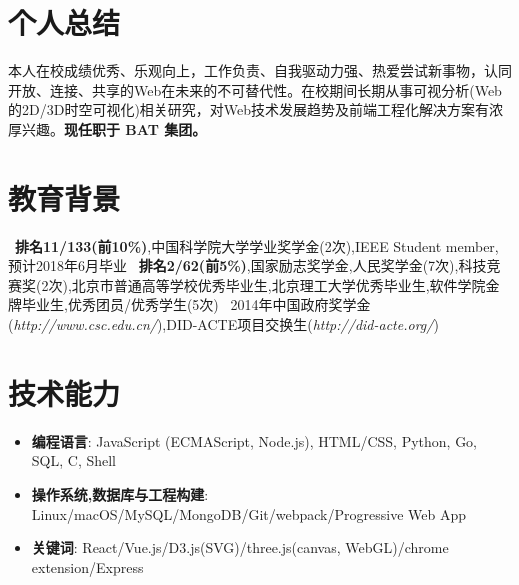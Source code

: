 \documentclass{resume}
\begin{document}

 
\section{个人总结}
本人在校成绩优秀、乐观向上，工作负责、自我驱动力强、热爱尝试新事物，认同开放、连接、共享的Web在未来的不可替代性。在校期间长期从事可视分析(Web的2D/3D时空可视化)相关研究，对Web技术发展趋势及前端工程化解决方案有浓厚兴趣。\textbf{现任职于 BAT 集团。}

\section{教育背景}
\ \textbf{排名11/133(前10\%)},中国科学院大学学业奖学金(2次),IEEE Student member,预计2018年6月毕业
\ \textbf{排名2/62(前5\%)},国家励志奖学金,人民奖学金(7次),科技竞赛奖(2次),北京市普通高等学校优秀毕业生,北京理工大学优秀毕业生,软件学院金牌毕业生,优秀团员/优秀学生(5次)
\ 2014年中国政府奖学金(\textit{http://www.csc.edu.cn/}),DID-ACTE项目交换生(\textit{http://did-acte.org/})

\section{技术能力}
\begin{itemize}[parsep=0.2ex]
  \item \textbf{编程语言}: JavaScript (ECMAScript, Node.js), HTML/CSS, Python, Go, SQL, C, Shell
  \item \textbf{操作系统,数据库与工程构建}: Linux/macOS/MySQL/MongoDB/Git/webpack/Progressive Web App
  \item \textbf{关键词}: React/Vue.js/D3.js(SVG)/three.js(canvas, WebGL)/chrome extension/Express
\end{itemize}
\end{document}
